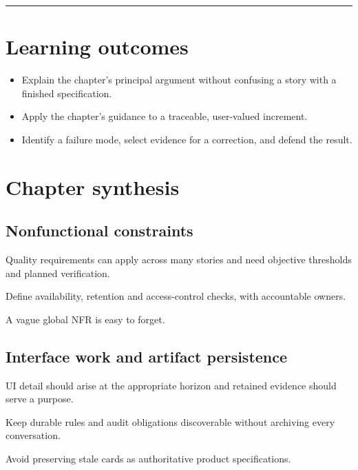 \documentclass[11pt,letterpaper]{article}
\begin{document}
\tableofcontents\medskip\noindent\rule{\linewidth}{0.4pt}\medskip
\section{Learning outcomes}
\begin{itemize}[leftmargin=*,itemsep=2pt]
\item Explain the chapter's principal argument without confusing a story with a finished specification.
\item Apply the chapter's guidance to a traceable, user-valued increment.
\item Identify a failure mode, select evidence for a correction, and defend the result.
\end{itemize}
\section{Chapter synthesis}
\subsection{Nonfunctional constraints}
Quality requirements can apply across many stories and need objective thresholds and planned verification.

\begin{tcolorbox}[colback=tealback,colframe=navy,title={Engineering translation},breakable]
Define availability, retention and access-control checks, with accountable owners.

\end{tcolorbox}
\begin{tcolorbox}[colback=amberback,colframe=navy,title={Failure mode to watch},breakable]
A vague global NFR is easy to forget.

\end{tcolorbox}
\subsection{Interface work and artifact persistence}
UI detail should arise at the appropriate horizon and retained evidence should serve a purpose.

\begin{tcolorbox}[colback=tealback,colframe=navy,title={Engineering translation},breakable]
Keep durable rules and audit obligations discoverable without archiving every conversation.

\end{tcolorbox}
\begin{tcolorbox}[colback=amberback,colframe=navy,title={Failure mode to watch},breakable]
Avoid preserving stale cards as authoritative product specifications.

\end{tcolorbox}
\end{document}
